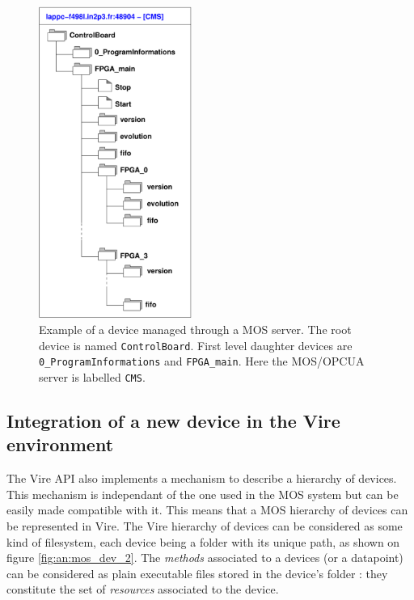 \begin{figure}[h]
\begin{center}
\includegraphics[width=5cm]{appendix/images/MOS_device_example_1.pdf}
\end{center}
\caption{Example of a  device managed through a MOS  server.  The root
  device is named \texttt{ControlBoard}.  First level daughter devices
  are  \texttt{0\_ProgramInformations} and  \texttt{FPGA\_main}.  Here
  the          MOS/OPCUA          server          is          labelled
  \texttt{CMS}.}\label{fig:an:mos_dev_1}
\end{figure}



\subsection{Integration of a new device in the Vire environment}

The Vire  API also implements a  mechanism to describe a  hierarchy of
devices.  This  mechanism is independant  of the  one used in  the MOS
system but can  be easily made compatible with it.   This means that a
MOS  hierarchy  of devices  can  be  represented  in Vire.   The  Vire
hierarchy of  devices can  be considered as  some kind  of filesystem,
each device  being a folder with  its unique path, as  shown on figure
\ref{fig:an:mos_dev_2}.   The \emph{methods}  associated to  a devices
(or a datapoint) can be considered as plain executable files stored in
the  device's folder  : they  constitute the  set of  \emph{resources}
associated to the device.


